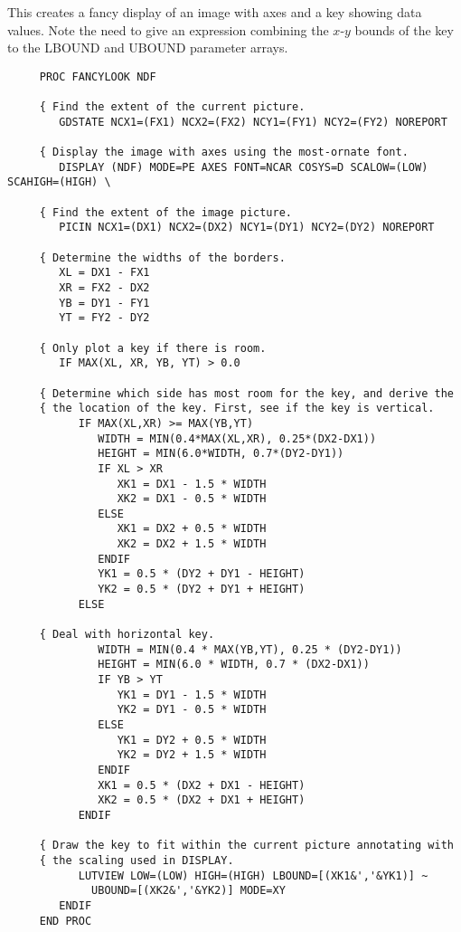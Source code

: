 This creates a fancy display of an image with axes and a key showing data
values.
Note the need to give an expression combining the $x$-$y$ bounds of the key to
the LBOUND and UBOUND parameter arrays.

\begin{small}
\begin{verbatim}
     PROC FANCYLOOK NDF

     { Find the extent of the current picture.
        GDSTATE NCX1=(FX1) NCX2=(FX2) NCY1=(FY1) NCY2=(FY2) NOREPORT

     { Display the image with axes using the most-ornate font.
        DISPLAY (NDF) MODE=PE AXES FONT=NCAR COSYS=D SCALOW=(LOW) SCAHIGH=(HIGH) \

     { Find the extent of the image picture.
        PICIN NCX1=(DX1) NCX2=(DX2) NCY1=(DY1) NCY2=(DY2) NOREPORT

     { Determine the widths of the borders.
        XL = DX1 - FX1
        XR = FX2 - DX2
        YB = DY1 - FY1
        YT = FY2 - DY2

     { Only plot a key if there is room. 
        IF MAX(XL, XR, YB, YT) > 0.0

     { Determine which side has most room for the key, and derive the
     { the location of the key. First, see if the key is vertical.
           IF MAX(XL,XR) >= MAX(YB,YT)
              WIDTH = MIN(0.4*MAX(XL,XR), 0.25*(DX2-DX1))
              HEIGHT = MIN(6.0*WIDTH, 0.7*(DY2-DY1))
              IF XL > XR
                 XK1 = DX1 - 1.5 * WIDTH
                 XK2 = DX1 - 0.5 * WIDTH
              ELSE
                 XK1 = DX2 + 0.5 * WIDTH
                 XK2 = DX2 + 1.5 * WIDTH
              ENDIF
              YK1 = 0.5 * (DY2 + DY1 - HEIGHT)
              YK2 = 0.5 * (DY2 + DY1 + HEIGHT)
           ELSE

     { Deal with horizontal key.
              WIDTH = MIN(0.4 * MAX(YB,YT), 0.25 * (DY2-DY1))
              HEIGHT = MIN(6.0 * WIDTH, 0.7 * (DX2-DX1))
              IF YB > YT
                 YK1 = DY1 - 1.5 * WIDTH
                 YK2 = DY1 - 0.5 * WIDTH
              ELSE
                 YK1 = DY2 + 0.5 * WIDTH
                 YK2 = DY2 + 1.5 * WIDTH
              ENDIF
              XK1 = 0.5 * (DX2 + DX1 - HEIGHT)
              XK2 = 0.5 * (DX2 + DX1 + HEIGHT)
           ENDIF

     { Draw the key to fit within the current picture annotating with 
     { the scaling used in DISPLAY.
           LUTVIEW LOW=(LOW) HIGH=(HIGH) LBOUND=[(XK1&','&YK1)] ~
             UBOUND=[(XK2&','&YK2)] MODE=XY
        ENDIF
     END PROC
\end{verbatim}
\end{small}
